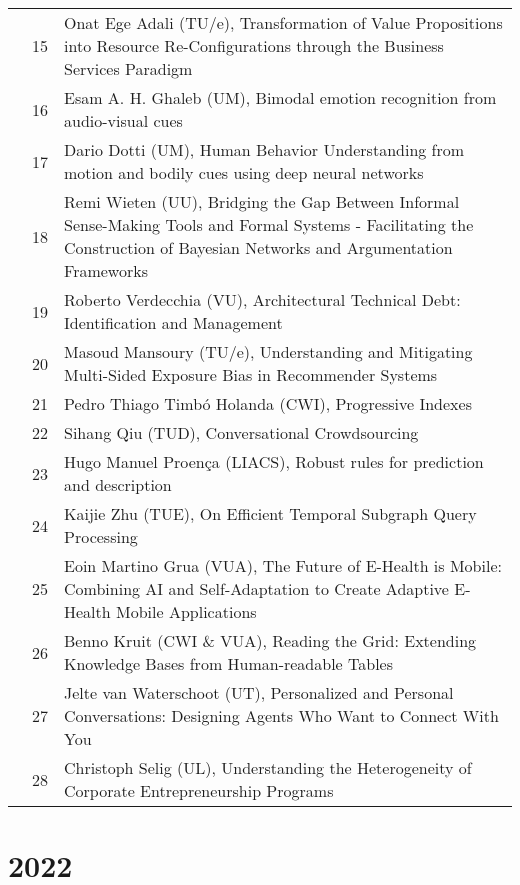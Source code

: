 {\begin{xltabular}{\linewidth}{@{} l @{\hspace{0.5em}} l @{\hspace{1em}} X @{}}
        &	 15	& 	 Onat Ege Adali (TU/e), Transformation of Value Propositions into Resource Re-Configurations through the Business Services Paradigm  \\
        &	 16	&	 Esam A. H. Ghaleb (UM), Bimodal emotion recognition from audio-visual cues \\
        &	 17	&	 Dario Dotti (UM), Human Behavior Understanding  from motion and bodily cues using deep neural networks \\
        &	 18	&	 Remi Wieten (UU), Bridging the Gap Between Informal Sense-Making Tools and Formal Systems - Facilitating the Construction of Bayesian Networks and Argumentation Frameworks \\
        &	 19	&	 Roberto Verdecchia (VU), Architectural Technical Debt: Identification and Management \\
        &	 20	&	 Masoud Mansoury (TU/e), Understanding and Mitigating Multi-Sided Exposure Bias in Recommender Systems \\
        &	 21	&	 Pedro Thiago Timb\'{o} Holanda (CWI), Progressive Indexes \\
        &	 22	&	 Sihang Qiu (TUD), Conversational Crowdsourcing \\
        &	 23	&	 Hugo Manuel Proen\c{c}a (LIACS), Robust rules for prediction and description \\
        &	 24	&	 Kaijie Zhu (TUE), On Efficient Temporal Subgraph Query Processing \\
        &	 25	&	 Eoin Martino Grua (VUA), The Future of E-Health is Mobile: Combining AI and Self-Adaptation to Create Adaptive E-Health Mobile Applications \\
        &	 26	& 	 Benno Kruit (CWI \& VUA), Reading the Grid: Extending Knowledge Bases from Human-readable Tables \\
        &	 27	&	 Jelte van Waterschoot (UT), Personalized and Personal Conversations: Designing Agents Who Want to Connect With You \\
        &	 28	&	 Christoph Selig (UL), Understanding the Heterogeneity of Corporate Entrepreneurship Programs \\

\end{xltabular}

\section*{2022}
\begin{xltabular}{\linewidth}{@{} l @{\hspace{0.5em}} l @{\hspace{1em}} X @{}}


\end{xltabular}}
